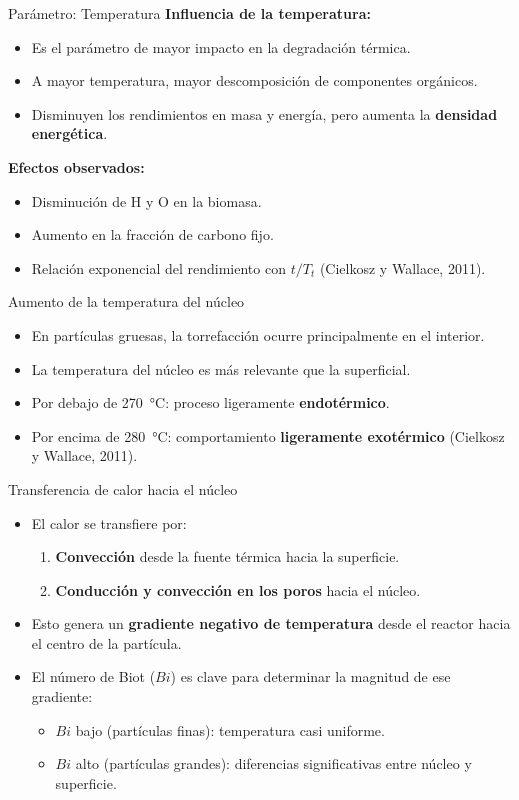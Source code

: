 \documentclass[main.tex]{subfiles}
\begin{document}
\begin{frame}{Parámetro: Temperatura}
\textbf{Influencia de la temperatura:}
\begin{itemize}
  \item Es el parámetro de mayor impacto en la degradación térmica.
  \item A mayor temperatura, mayor descomposición de componentes orgánicos.
  \item Disminuyen los rendimientos en masa y energía, pero aumenta la \textbf{densidad energética}.
\end{itemize}

\vspace{0.5em}
\textbf{Efectos observados:}
\begin{itemize}
  \item Disminución de H y O en la biomasa.
  \item Aumento en la fracción de carbono fijo.
  \item Relación exponencial del rendimiento con $t/T_t$ (Cielkosz y Wallace, 2011).
\end{itemize}
\end{frame}

\begin{frame}{Aumento de la temperatura del núcleo}
\begin{itemize}
  \item En partículas gruesas, la torrefacción ocurre principalmente en el interior.
  \item La temperatura del núcleo es más relevante que la superficial.
  \item Por debajo de \SI{270}{\celsius}: proceso ligeramente \textbf{endotérmico}.
  \item Por encima de \SI{280}{\celsius}: comportamiento \textbf{ligeramente exotérmico} (Cielkosz y Wallace, 2011).
\end{itemize}
\end{frame}

\begin{frame}{Transferencia de calor hacia el núcleo}
\begin{itemize}
  \item El calor se transfiere por:
  \begin{enumerate}
    \item \textbf{Convección} desde la fuente térmica hacia la superficie.
    \item \textbf{Conducción y convección en los poros} hacia el núcleo.
  \end{enumerate}
  \item Esto genera un \textbf{gradiente negativo de temperatura} desde el reactor hacia el centro de la partícula.
  \item El número de Biot ($Bi$) es clave para determinar la magnitud de ese gradiente:
  \begin{itemize}
    \item $Bi$ bajo (partículas finas): temperatura casi uniforme.
    \item $Bi$ alto (partículas grandes): diferencias significativas entre núcleo y superficie.
  \end{itemize}
\end{itemize}
\end{frame}
\end{document}
